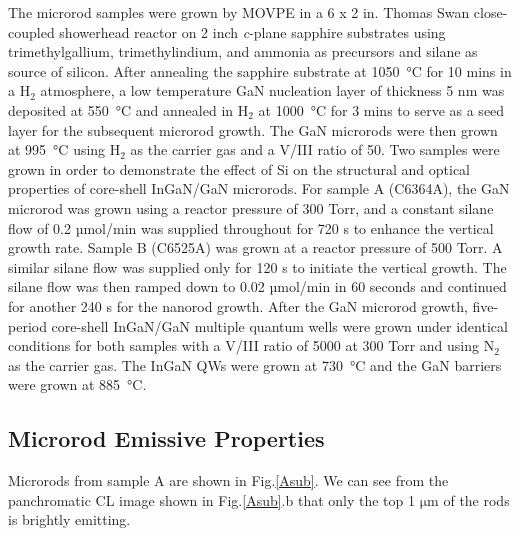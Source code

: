 The microrod samples were grown by MOVPE in a 6 x 2 in. Thomas Swan close-coupled showerhead reactor on 2 inch \textit{c}-plane sapphire substrates using trimethylgallium, trimethylindium, and ammonia as precursors and silane as source of silicon. After annealing the sapphire substrate at \SI{1050}{\degree}C for 10 mins in a $\mathrm{H_{2}}$ atmosphere, a low temperature GaN nucleation layer of thickness 5 nm was deposited at \SI{550}{\degree}C and annealed in $\mathrm{H_{2}}$ at \SI{1000}{\degree}C for 3 mins to serve as a seed layer for the subsequent microrod growth. The GaN microrods were then grown at \SI{995}{\degree}C  using $\mathrm{H_{2}}$ as the carrier gas and a V/III ratio of 50. Two samples were grown in order to demonstrate the effect of Si on the structural and optical properties of core-shell InGaN/GaN microrods. For sample A (C6364A), the GaN microrod was grown using a reactor pressure of 300 Torr, and a constant silane flow of 0.2 µmol/min was supplied throughout for 720 s to enhance the vertical growth rate. Sample B (C6525A) was grown at a reactor pressure of 500 Torr. A similar silane flow was supplied only for 120 s to initiate the vertical growth. The silane flow was then ramped down to 0.02 µmol/min in 60 seconds and continued for another 240 s for the nanorod growth. After the GaN microrod growth, five-period core-shell InGaN/GaN multiple quantum wells were grown  under identical conditions for both samples with a V/III ratio of 5000 at 300 Torr and using $\mathrm{N_{2}}$ as the carrier gas. The InGaN QWs were grown at \SI{730}{\degree}C and the GaN barriers were grown at \SI{885}{\degree}C.

\subsection{Microrod Emissive Properties}
\label{rod emission}
Microrods from sample A are shown in Fig.\ref{Asub}. We can see from the panchromatic CL image shown in Fig.\ref{Asub}.b that only the top 1 $\mathrm{\mu}$m of the rods is brightly emitting.

